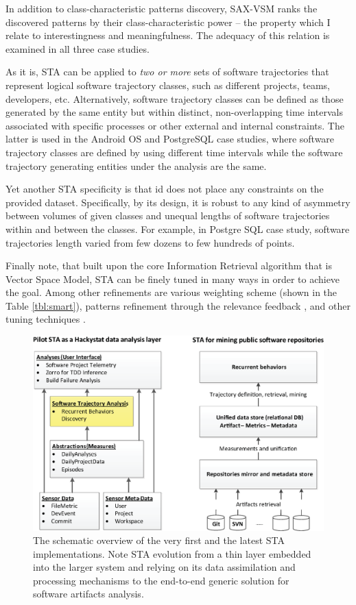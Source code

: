 In addition to class-characteristic patterns discovery, SAX-VSM ranks the discovered patterns by their class-characteristic power -- the property which I relate to interestingness and meaningfulness. The adequacy of this relation is examined in all three case studies.

As it is, STA can be applied to \textit{two or more} sets of software trajectories that represent logical software trajectory classes, such as different projects, teams, developers, etc. Alternatively, software trajectory classes can be defined as those generated by the same entity but within distinct, non-overlapping time intervals associated with specific processes or other external and internal constraints. The latter is used in the Android OS and PostgreSQL case studies, where software trajectory classes are defined by using different time intervals while the software trajectory generating entities under the analysis are the same.

Yet another STA specificity is that id does not place any constraints on the provided dataset. Specifically, by its design, it is robust to any kind of asymmetry between volumes of given classes and unequal lengths of software trajectories within and between the classes. For example, in Postgre SQL case study, software trajectories length varied from few dozens to few hundreds of points.

Finally note, that built upon the core Information Retrieval algorithm that is Vector Space Model, STA can be finely tuned in many ways in order to achieve the goal. Among other refinements are various weighting scheme (shown in the Table \ref{tbl:smart}), patterns refinement through the relevance feedback \cite{salton-71}, and other tuning techniques \cite{intro_ir_Manning}.

\begin{figure}[t]
   \centering
   \includegraphics[width=145mm]{figures/STA12-schema-draft.eps}
   \caption{The schematic overview of the very first and the latest STA implementations. 
   Note STA evolution from a thin layer embedded into the larger system and relying on its data assimilation and processing 
   mechanisms to the end-to-end generic solution for software artifacts analysis.}
   \label{fig:STA12-schema}
\end{figure}

